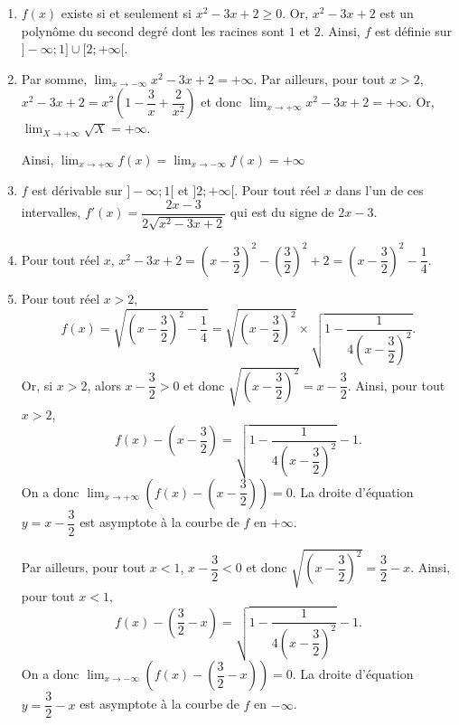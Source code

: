 \documentclass[11pt,fleqn, openany]{book} %
\begin{document}
\begin{solution}\hspace{0pt}

\begin{enumerate}
\item $f(x)$ existe si et seulement si $x^2-3x+2\geqslant 0$. Or, $x^2-3x+2$ est un polynôme du second degré dont les racines sont $1$ et $2$. Ainsi, $f$ est définie sur $]-\infty ;1]\cup [2;+\infty[$.
\item Par somme, $\displaystyle\lim_{x \to - \infty}x^2-3x+2=+\infty$. Par ailleurs, pour tout $x>2$, $x^2-3x+2=x^2\left(1-\dfrac{3}{x}+ \dfrac{2}{x^2}\right)$ et donc $\displaystyle\lim_{x \to + \infty}x^2-3x+2=+\infty$. Or, $\displaystyle\lim_{X \to + \infty}\sqrt{X}=+\infty$.

Ainsi, $\displaystyle\lim_{x \to + \infty}f(x)=\displaystyle\lim_{x \to - \infty}f(x)=+\infty$
\item $f$ est dérivable sur $]-\infty;1[$ et $]2;+\infty[$. Pour tout réel $x$ dans l'un de ces intervalles, $f'(x)=\dfrac{2x-3}{2\sqrt{x^2-3x+2}}$ qui est du signe de $2x-3$.
\begin{center}
\end{center}


\item Pour tout réel $x$, $x^2-3x+2 = \left(x-\dfrac{3}{2}\right)^2-\left(\dfrac{3}{2}\right)^2+2=\left(x-\dfrac{3}{2}\right)^2-\dfrac{1}{4}$.

\item Pour tout réel $x>2$,
\[f(x)=\sqrt{ \left(x-\dfrac{3}{2}\right)^2-\dfrac{1}{4}}= \sqrt{\left(x-\dfrac{3}{2}\right)^2} \times \sqrt{ 1-\dfrac{1}{4\left(x-\dfrac{3}{2}\right)^2}}.\]
Or, si $x>2$, alors $x-\dfrac{3}{2}>0$ et donc $\sqrt{\left(x-\dfrac{3}{2}\right)^2}=x-\dfrac{3}{2}$. Ainsi, pour tout $x>2$,
\[f(x)-\left(x-\dfrac{3}{2}\right) = \sqrt{ 1-\dfrac{1}{4\left(x-\dfrac{3}{2}\right)^2}}-1.\]
On a donc $\displaystyle\lim_{x\to+\infty}\left(f(x)-\left(x-\dfrac{3}{2}\right)\right)=0$. La droite d'équation $y=x-\dfrac{3}{2}$ est asymptote à la courbe de $f$ en $+\infty$.

Par ailleurs, pour tout $x<1$, $x-\dfrac{3}{2}<0$ et donc $\sqrt{\left(x-\dfrac{3}{2}\right)^2}=\dfrac{3}{2}-x$. Ainsi, pour tout $x<1$,
\[f(x)-\left(\dfrac{3}{2}-x\right) = \sqrt{ 1-\dfrac{1}{4\left(x-\dfrac{3}{2}\right)^2}}-1.\]
On a donc $\displaystyle\lim_{x\to-\infty}\left(f(x)-\left(\dfrac{3}{2}-x\right)\right)=0$. La droite d'équation $y=\dfrac{3}{2}-x$ est asymptote à la courbe de $f$ en $-\infty$.


\end{enumerate}
\end{solution}
\end{document}
